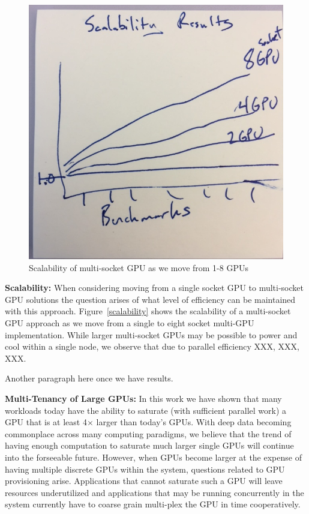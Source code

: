 \begin{figure}[tp]
    \centering
    \includegraphics[width=0.9\columnwidth]{figures/scalability.jpg}
    \caption{Scalability of multi-socket GPU as we move from 1-8 GPUs}
    \label{fig:scalability}
\end{figure}

\textbf{Scalability:} When considering moving from a single socket GPU to
multi-socket GPU solutions the question arises of what level of efficiency
can be maintained with this approach.  Figure~\ref{scalability} shows the
scalability of a multi-socket GPU approach as we move from a single to 
eight socket multi-GPU implementation.  While larger multi-socket GPUs
may be possible to power and cool within a single node, we observe that due
to parallel efficiency XXX, XXX, XXX.

Another paragraph here once we have results.\vspace{1in}

\textbf{Multi-Tenancy of Large GPUs:} In this work we have shown that many 
workloads today have the ability to
saturate (with sufficient parallel work) a GPU that is at least 4$\times$
larger than today's GPUs.  With deep data becoming commonplace across many
computing paradigms, we believe that the trend of having enough computation
to saturate much larger single GPUs will continue into the forseeable future.
However, when GPUs become larger at the expense of having multiple discrete
GPUs within the system, questions related to GPU provisioning arise.  Applications
that cannot saturate such a GPU will leave resources underutilized and applications
that may be running concurrently in the system currently have to coarse grain
multi-plex the GPU in time cooperatively.  

